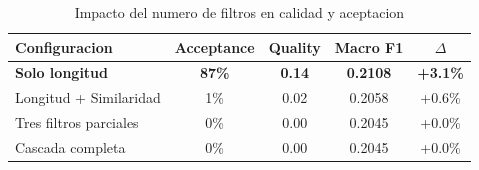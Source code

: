 
\begin{table}[h]
\centering
\caption{Impacto del numero de filtros en calidad y aceptacion}
\label{tab:filter_cascade}
\begin{tabular}{lcccc}
\hline
Configuracion & Acceptance & Quality & Macro F1 & $\Delta$ \\
\hline
\textbf{Solo longitud} & \textbf{87\%} & \textbf{0.14} & \textbf{0.2108} & \textbf{+3.1\%} \\
Longitud + Similaridad & 1\% & 0.02 & 0.2058 & +0.6\% \\
Tres filtros parciales & 0\% & 0.00 & 0.2045 & +0.0\% \\
Cascada completa & 0\% & 0.00 & 0.2045 & +0.0\% \\

\hline
\end{tabular}
\end{table}
